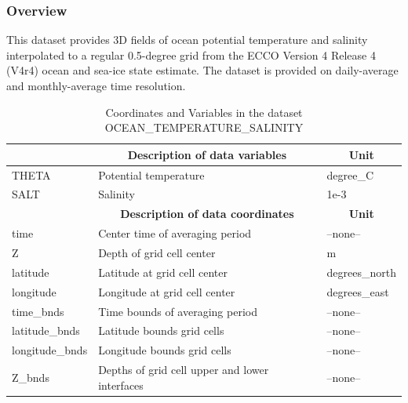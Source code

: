 \subsubsection{Overview}
This dataset provides 3D fields of ocean potential temperature and salinity interpolated to a regular 0.5-degree grid from the ECCO Version 4 Release 4 (V4r4) ocean and sea-ice state estimate. The dataset is provided on daily-average and monthly-average time resolution. 
\begin{longtable}{|m{}|m{}|m{}|}
\caption{Coordinates and Variables in the dataset OCEAN\_TEMPERATURE\_SALINITY}
\label{tab:table-OCEAN_TEMPERATURE_SALINITY-fields} \\ 
\hline \endhead \hline \endfoot
\rowcolor{lightgray} \multicolumn{1}{|c|}{\textbf{Variables}} & \multicolumn{1}{|c|}{\textbf{Description of data variables}} &  \multicolumn{1}{|c|}{\textbf{Unit}}\\ \hline
THETA &Potential temperature  &degree\_C  \\ \hline
SALT &Salinity &1e-3  \\ \hline
\rowcolor{lightgray} \multicolumn{1}{|c|}{\textbf{Coordinates}} & \multicolumn{1}{|c|}{\textbf{Description of data coordinates}} &  \multicolumn{1}{|c|}{\textbf{Unit}}\\ \hline
time &Center time of averaging period &--none--  \\ \hline
Z &Depth of grid cell center &m  \\ \hline
latitude &Latitude at grid cell center &degrees\_north  \\ \hline
longitude &Longitude at grid cell center &degrees\_east  \\ \hline
time\_bnds &Time bounds of averaging period &--none--  \\ \hline
latitude\_bnds &Latitude bounds grid cells &--none--  \\ \hline
longitude\_bnds &Longitude bounds grid cells &--none--  \\ \hline
Z\_bnds &Depths of grid cell upper and lower interfaces &--none--  \\ \hline
\end{longtable}

\newp
\pagebreak
